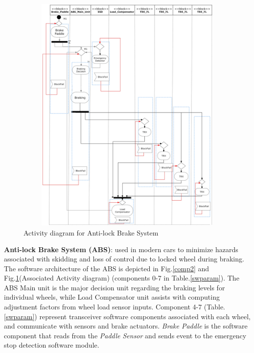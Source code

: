 \documentclass[3p,times,procedia,authoryear,round]{elsarticle}
\begin{document}
\begin{figure}[!htb]
	\centering
	
	\centering
	\includegraphics[width=350pt, height=340pt]{ActivityAbs.jpg}
	\caption{Activity diagram for Anti-lock Brake System }
	\label{abs1}
	
\end{figure}




\textbf{Anti-lock Brake System (ABS)}: used in modern cars to minimize hazards associated with skidding and loss of control due to locked wheel during braking. The software architecture of the ABS is depicted in Fig.\ref{comp2} and Fig.\ref{abs1}(Associated Activity diagram) (components 0-7 in Table.\ref{swparam}). The ABS Main unit is the major decision unit regarding the braking levels for individual wheels, while Load Compensator unit assists with computing adjustment factors from wheel load sensor inputs. Component 4-7 (Table.\ref{swparam}) represent transceiver software components associated with each wheel, and communicate with sensors and brake actuators. \emph{Brake Paddle} is the software component that reads from the \emph{Paddle Sensor} and sends event to the emergency stop detection software module. 
 
\end{document}

